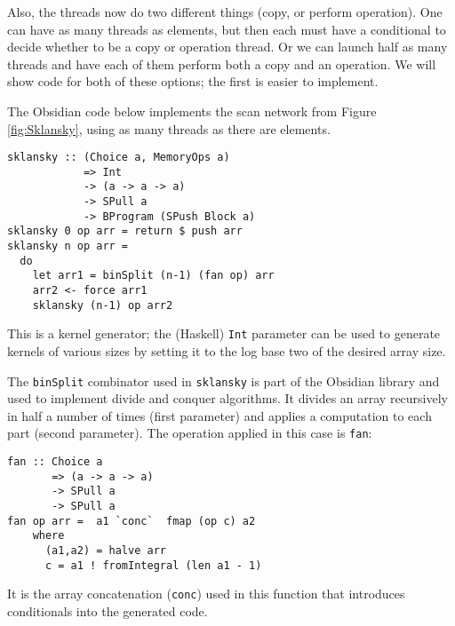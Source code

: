 Also, the threads now do two different things 
(copy, or perform operation). 
One can have as many threads as elements, but then each must have
a conditional to decide whether to be a copy or operation thread.
Or we can launch half as many threads and have each of them perform 
both a copy and an operation. 
We will show code for both of these options; the first is
easier to implement.


The Obsidian code below implements the scan network from Figure \ref{fig:Sklansky}, using as many threads as there are elements.

\begin{small} 
\begin{Verbatim}[samepage=true]
sklansky :: (Choice a, MemoryOps a)
            => Int
            -> (a -> a -> a)
            -> SPull a
            -> BProgram (SPush Block a)
sklansky 0 op arr = return $ push arr
sklansky n op arr =
  do 
    let arr1 = binSplit (n-1) (fan op) arr
    arr2 <- force arr1
    sklansky (n-1) op arr2
\end{Verbatim} 
\end{small} %

This is a kernel generator;
the (Haskell) {\tt Int} parameter can be used to generate kernels of various sizes by setting 
it to the log base two of the desired array size. 

The {\tt binSplit} combinator used in {\tt sklansky} is part of the Obsidian library 
and used to implement divide and conquer algorithms. It divides an array recursively in half 
a number of times (first parameter) and applies a computation to each part (second parameter). 
The operation applied in this case is {\tt fan}: 

\begin{small}
\begin{Verbatim}[samepage=true]
fan :: Choice a
       => (a -> a -> a)
       -> SPull a
       -> SPull a
fan op arr =  a1 `conc`  fmap (op c) a2 
    where 
      (a1,a2) = halve arr
      c = a1 ! fromIntegral (len a1 - 1)
\end{Verbatim}
\end{small}

It is the array concatenation ({\tt conc}) used in this function that introduces 
conditionals into the generated code. 

